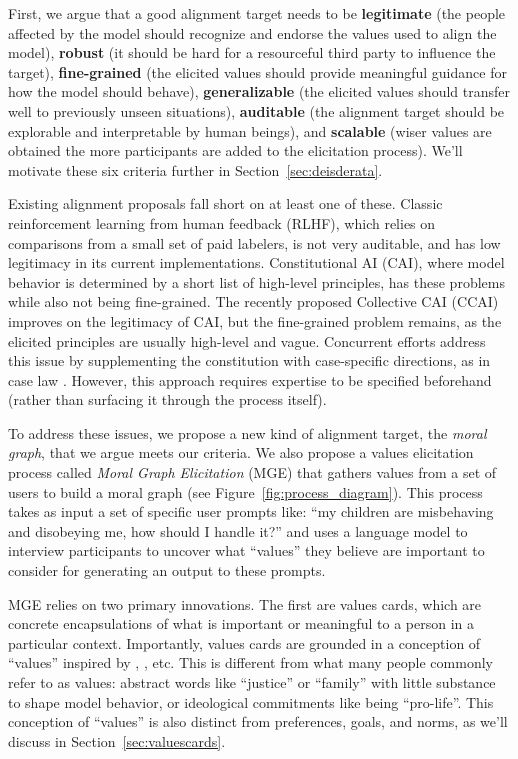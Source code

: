 \documentclass{article}
\theoremstyle{definition}
\begin{document}
First, we argue that a good alignment target needs to be \textbf{legitimate} (the people affected by the model should recognize and endorse the values used to align the model), \textbf{robust} (it should be hard for a resourceful third party to influence the target), \textbf{fine-grained} (the elicited values should provide meaningful guidance for how the model should behave), \textbf{generalizable} (the elicited values should transfer well to previously unseen situations), \textbf{auditable} (the alignment target should be explorable and interpretable by human beings), and \textbf{scalable} (wiser values are obtained the more participants are added to the elicitation process). We'll motivate these six criteria further in Section~\ref{sec:deisderata}. 

Existing alignment proposals fall short on at least one of these. Classic reinforcement learning from human feedback (RLHF), which relies on comparisons from a small set of paid labelers, is not very auditable, and has low legitimacy in its current implementations. Constitutional AI (CAI), where model behavior is determined by a short list of high-level principles, has these problems while also not being fine-grained. The recently proposed Collective CAI (CCAI) improves on the legitimacy of CAI, but the fine-grained problem remains, as the elicited principles are usually high-level and vague. Concurrent efforts address this issue by supplementing the constitution with case-specific directions, as in case law \citep{chen2023case}. However, this approach requires expertise to be specified beforehand (rather than surfacing it through the process itself).

To address these issues, we propose a new kind of alignment target, the \textit{moral graph}, that we argue meets our criteria. We also propose a values elicitation process called \textit{Moral Graph Elicitation} (MGE) that gathers values from a set of users to build a moral graph (see Figure~\ref{fig:process_diagram}). This process takes as input a set of specific user prompts like: “my children are misbehaving and disobeying me, how should I handle it?” and uses a language model to interview participants to uncover what “values” they believe are important to consider for generating an output to these prompts. 

MGE relies on two primary innovations. The first are values cards, which are concrete encapsulations of what is important or meaningful to a person in a particular context. Importantly, values cards are grounded in a conception of “values” inspired by \cite{Taylor1977}, \cite{Velleman1989}, etc.  This is different from what many people commonly refer to as values: abstract words like “justice” or “family” with little substance to shape model behavior, or ideological commitments like being “pro-life”. This conception of “values” is also distinct from preferences, goals, and norms, as we’ll discuss in Section~\ref{sec:valuescards}.
\end{document}
